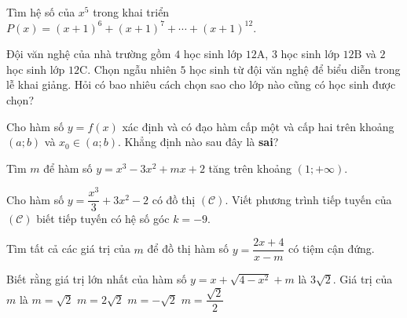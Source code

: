 \begin{ex}%
Tìm hệ số của $x^5$ trong khai triển $P(x)=(x+1)^6+(x+1)^7+\cdots+(x+1)^{12}$.
\end{ex}
\begin{ex}%
Đội văn nghệ của nhà trường gồm $4$ học sinh lớp $12\mathrm{A}$, $3$ học sinh lớp $12\mathrm{B}$ và $2$ học sinh lớp $12\mathrm{C}$. Chọn ngẫu nhiên $5$ học sinh từ đội văn nghệ để biểu diễn trong lễ khai giảng. Hỏi có bao nhiêu cách chọn sao cho lớp nào cũng có học sinh được chọn?
\end{ex}
\begin{ex}%
Cho hàm số $y=f(x)$ xác định và có đạo hàm cấp một và cấp hai trên khoảng $(a;b)$ và $x_0 \in (a;b)$. Khẳng định nào sau đây là \textbf{sai}?
\end{ex}
\begin{ex}%
Tìm $m$ để hàm số $y=x^3-3x^2+mx+2$ tăng trên khoảng $(1;+\infty)$.
\end{ex}
\begin{ex}%
Cho hàm số $y=\dfrac{x^3}{3}+3x^2-2$ có đồ thị $\left(\mathscr{C}\right)$. Viết phương trình tiếp tuyến của $\left(\mathscr{C}\right)$ biết tiếp tuyến có hệ số góc $k=-9$.
\end{ex}
\begin{ex}%
Tìm tất cả các giá trị của $m$ để đồ thị hàm số $y=\dfrac{2x+4}{x-m}$ có tiệm cận đứng.
\end{ex}
\begin{ex}%
Biết rằng giá trị lớn nhất của hàm số $y=x+ \sqrt{4-x^2}+m$ là $3\sqrt{2}$. Giá trị của $m$ là
\choice
{\True $m=\sqrt{2}$}
{$m=2\sqrt{2}$}
{$m=-\sqrt{2}$}
{$m=\dfrac{\sqrt{2}}{2}$}
\end{ex}

